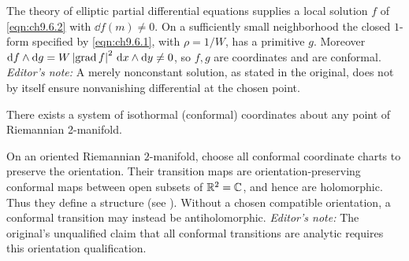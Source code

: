 \documentclass[../main]{subfiles}
\begin{document}
The theory of elliptic partial differential equations supplies a local solution $f$ of \eqref{eqn:ch9.6.2} with $\dd f(m)\neq0$. On a sufficiently small neighborhood the closed $1$-form specified by \eqref{eqn:ch9.6.1}, with $\rho=1/W$, has a primitive $g$. Moreover $\mathrm{d}f\wedge\mathrm{d}g=W\left|\operatorname{grad} f\right|^2\,\mathrm{d}x\wedge\mathrm{d}y\neq0$, so $f,g$ are coordinates and are conformal. \emph{Editor's note:} A merely nonconstant solution, as stated in the original, does not by itself ensure nonvanishing differential at the chosen point.



\begin{theorem} \label{thm:ch9.6.1}
There exists a system of isothormal (conformal) coordinates about any point of Riemannian 2-manifold.

On an oriented Riemannian $2$-manifold, choose all conformal coordinate charts to preserve the orientation. Their transition maps are orientation-preserving conformal maps between open subsets of $\mathbb{R}^2=\mathbb{C}$, and hence are holomorphic. Thus they define a  structure (see \cite{ahlfors1960riemann}). Without a chosen compatible orientation, a conformal transition may instead be antiholomorphic. \emph{Editor's note:} The original's unqualified claim that all conformal transitions are analytic requires this orientation qualification.
\end{theorem}
\end{document}
